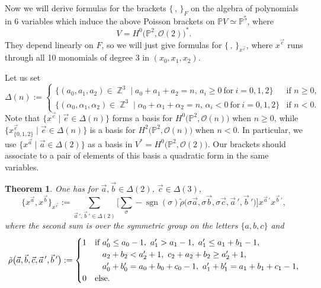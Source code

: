 \documentclass[10pt,a4paper]{amsart}
\numberwithin{equation}{section}
\newtheorem{Theorem}{Theorem}[section]
\DeclareMathOperator\Z{\mathbb Z}
\renewcommand{\P}{{\mathbb P}}
\newcommand{\OO}{{\mathcal O}}
\begin{document}
Now we will derive formulas for the brackets $\{\,,\,\}_F$ on the algebra of polynomials in $6$ variables which induce the above Poisson brackets on $\P V\simeq \P^5$,
where
\[
V=H^0\big(\P^2,\OO(2)\big)^*.
\]
They depend linearly on $F$, so we will just give formulas for $\{\,,\,\}_{x^{\vec{c}}}$, where $x^{\vec{c}}$ runs through all 10 monomials of degree $3$ in $(x_0,x_1,x_2)$.

Let us set
\[\Delta(n):=\begin{cases}
	\big\{(a_0,a_1,a_2)\in\Z^3\mid a_0+a_1+a_2=n,\, a_i\geq 0 \ \text{for} \ i=0,1,2\big\}& \text{if }n\geq 0,\\
	\big\{(\alpha_0,\alpha_1,\alpha_2)\in \Z^3\mid \alpha_0+\alpha_1+\alpha_2=n,\, \alpha_i<0 \ \text{for}  \ i=0,1,2\big\} & \text{if }n<0.
\end{cases}\]
Note that $\{x^{\vec{e}}\mid \vec{e}\in \Delta(n)\}$ forms a basis for $H^0\big(\P^2,\OO(n)\big)$ when $n\geq 0$, while
$\big\{x^{\vec{e}}_{\{0,1,2\}}\mid \vec{e}\in \Delta(n)\big\}$ is a basis for $H^2\big(\P^2,\OO(n)\big)$ when $n<0$.
In particular, we use $\big\{x^{\vec{a}} \mid \vec{a}\in\Delta(2)\big\}$ as a basis in $V^*=H^0\big(\P^2,\OO(2)\big)$. Our brackets should associate to a pair of elements of this basis a quadratic form
in the same variables.


\begin{Theorem}\label{main-thm} One has for $\vec{a},\vec{b}\in\Delta(2)$, $\vec{c}\in\Delta(3)$,
\begin{equation}\label{main-formula-eq}
\big\{x^{\vec{a}},x^{\vec{b}}\big\}_{x^{\vec{c}}}:=\sum_{\vec{a}\,{}',\vec{b}\,{}'\in \Delta(2)}\bigg[\sum_{\sigma}-\operatorname{sgn}(\sigma)\tilde{\rho}\big(\sigma\vec{a}, \sigma\vec{b},\sigma\vec{c},\vec{a}\,{}',\vec{b}\,{}'\big)\bigg]x^{\vec{a}\,{}'}x^{\vec{b}\,{}'},
\end{equation}
	where the second sum is over the symmetric group on the letters $\{a,b,c\}$ and
	\[\tilde{\rho}\big(\vec{a},\vec{b},\vec{c},\vec{a}\,{}',\vec{b}\,{}'\big):=\begin{cases}
  1 & \text{if} \ a_0'\leq a_0-1, \ a_1'>a_1-1,\ a_1'\leq a_1+b_1-1,\\
	
    & \hphantom{\text{if}}{}\ a_2+b_2<a_2'+1,\ c_2+a_2+b_2\geq a_2'+1,\\
	
	& \hphantom{\text{if}}{}\ a_0'+b_0'=a_0+b_0+c_0-1,\ a_1'+b_1'=a_1+b_1+c_1-1,\\
	0 & \text{else}.
\end{cases}\]
\end{Theorem}
\end{document}
